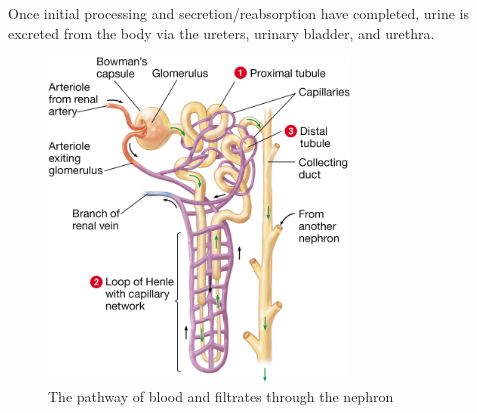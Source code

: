 \documentclass{article}
\begin{document}
Once initial processing and secretion/reabsorption have completed, urine is
excreted from the body via the ureters, urinary bladder, and urethra.

\begin{figure}
	\centering
	\includegraphics[width=8cm]{nephron_structure.png}
	\caption{The pathway of blood and filtrates through the nephron}
\end{figure}
\end{document}
